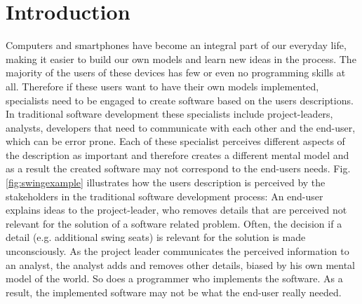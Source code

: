\documentclass[runningheads,a4paper]{llncs}
\begin{document}
\section{Introduction}
Computers and smartphones have become an integral part of our everyday life, making it easier to build our own models and learn new ideas in the process.
The majority of the users of these devices has few or even no programming skills at all.
Therefore if these users want to have their own models implemented, specialists need to be engaged to create software based on the users descriptions. 
In traditional software development these specialists include project-leaders, analysts, developers that need 
to communicate with each other and the end-user, which can be error prone.
Each of these specialist perceives different aspects of the description as important and therefore creates a different mental model
and as a result the created software may not correspond to the end-users needs. 
Fig. \ref{fig:swingexample} illustrates how the users description is perceived by the stakeholders in the traditional software development process:
An end-user explains ideas to the project-leader, who removes details that are perceived not relevant for the solution of a software related problem.
Often, the decision if a detail (e.g. additional swing seats) is relevant for the solution is made unconsciously. 
As the project leader communicates the perceived information to an analyst, the analyst adds and removes other details, biased by his own mental model of the world. 
So does a programmer who implements the software. As a result, the implemented software may not be what the end-user really needed.
\end{document}
